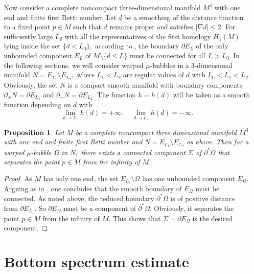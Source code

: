 \documentclass{amsart}
\newtheorem{proposition}[theorem]{Proposition}
\numberwithin{equation}{section}
\begin{document}
Now consider a complete noncompact three-dimensional manifold $M^{3}$ with one end and finite first Betti number. 
Let $d$ be a smoothing of the distance function to a fixed point $p\in M$ such that $d$ remains proper and satisfies 
$\left\vert \nabla d\right\vert \leq 2.$ 
For sufficiently large $L_0$ with all the representatives of the first homology $H_1(M)$ lying inside the set $\{d<L_0\},$
according to \cite{LT}, the boundary $\partial E_L$ of the only unbounded component $E_L$ of $M\setminus \{d\leq L\}$  
must be connected for all $L>L_0.$ 
In the following sections, we will consider warped $\mu$-bubbles in a $3$-dimensional manifold $N=E_{L_1}\setminus E_{L_2},$
where $L_1<L_2$ are regular values of $d$ with $L_0<L_1<L_2.$ Obviously,  
the set $N$ is a compact smooth manifold with boundary
components $\partial _{+}N=\partial E_{L_1}$ and $\partial _{-}N=\partial E_{L_2}.$
The function $h=h\left( d\right) $ will be taken as a smooth function depending on $d$ with
\begin{equation}
\lim_{d\rightarrow L_1}h\left( d\right) =+\infty ,\ \ \ \ \
\lim_{d\rightarrow L_2}h\left( d\right) =-\infty.  \label{a1}
\end{equation}

\begin{proposition}\label{X}
Let $M$ be a complete noncompact three dimensional manifold $M^{3}$ with one end and finite first Betti number
and $N=E_{L_1}\setminus E_{L_2}$ as above. Then for a warped $\mu$-bubble $\Omega$ in $N,$ there exists  
a connected component $\Sigma$ of $\partial ^{\ast }\Omega $ that separates the point
$p\in M$ from the infinity of $M.$ 
\end{proposition}

\begin{proof}
As $M$ has only one end, the set $E_{L_1}\setminus \Omega$ has one unbounded component $E_{\Omega}.$ 
Arguing as in \cite{LT}, one concludes that the smooth boundary of $E_{\Omega}$ must be connected. 
As noted above, the reduced boundary $\partial ^{\ast }\Omega $ is of positive distance from $\partial E_{L_1}.$
So $\partial E_{\Omega}$ must be a component of $\partial ^{\ast }\Omega.$ Obviously, it separates the point
$p\in M$ from the infinity of $M.$ 
This shows that $\Sigma=\partial E_{\Omega}$
is the desired component.
\end{proof}

\section{Bottom spectrum estimate}
\end{document}
